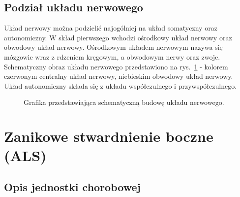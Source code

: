 \documentclass[twoside,a4paper]{book}
\begin{document}
\subsection{Podział układu nerwowego}
Układ nerwowy można podzielić najogólniej na układ somatyczny oraz autonomiczny. W skład pierwszego wchodzi ośrodkowy układ nerwowy oraz obwodowy układ nerwowy. Ośrodkowym układem nerwowym nazywa się mózgowie wraz z rdzeniem kręgowym, a obwodowym nerwy oraz zwoje. Schematyczny obraz układu nerwowego przedstawiono na rys.~\ref{fig:nervesystem} - kolorem czerwonym centralny układ nerwowy, niebieskim obwodowy układ nerwowy. Układ autonomiczny składa się z układu współczulnego i przywspółczulnego. 

	
	\begin{figure}[!h]

		\centering		
		\caption{Grafika przedstawiająca schematyczną budowę układu nerwowego. }
		\label{fig:nervesystem}
	\end{figure}

\section{Zanikowe  stwardnienie boczne (ALS)}
\subsection{ Opis jednostki chorobowej}
\end{document}

